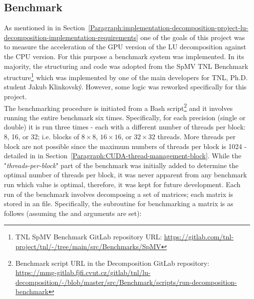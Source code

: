 \subsection{Benchmark \TO}\label{Subsection:implementation-decomposition-project-benchmark}
As mentioned in \textit{} in Section~\ref{Paragraph:implementation-decomposition-project-lu-decomposition-implementation-requirements} one of the goals of this project was to measure the acceleration of the GPU version of the LU decomposition against the CPU version. For this purpose a benchmark system was implemented. In its majority, the structuring and code was adopted from the SpMV TNL Benchmark structure\footnote{TNL SpMV Benchmark GitLab repository URL: \url{https://gitlab.com/tnl-project/tnl/-/tree/main/src/Benchmarks/SpMV}} which was implemented by one of the main developers for TNL, Ph.D. student Jakub Klinkovský. However, some logic was reworked specifically for this project. \\
The benchmarking procedure is initiated from a Bash script\footnote{Benchmark script URL in the Decomposition GitLab repository: \url{https://mmg-gitlab.fjfi.cvut.cz/gitlab/tnl/lu-decomposition/-/blob/master/src/Benchmark/scripts/run-decomposition-benchmark}} and it involves running the entire benchmark six times. Specifically, for each precision (single or double) it is run three times - each with a different number of threads per block: 8, 16, or  32; i.e. blocks of $ 8 \times 8 $, $ 16 \times 16 $, or $ 32 \times 32 $ threads. More threads per block are not possible since the maximum numbers of threads per block is 1024 - detailed in \textit{} in Section~\ref{Paragraph:CUDA-thread-management-block}. While the "\textit{threads-per-block}" part of the benchmark was initially added to determine the optimal number of threads per block, it was never apparent from any benchmark run which value is optimal, therefore, it was kept for future development. Each run of the benchmark involves decomposing a set of matrices; each matrix is stored in an  file. Specifically, the subroutine for benchmarking a matrix is as follows (assuming the  and  arguments are set):


